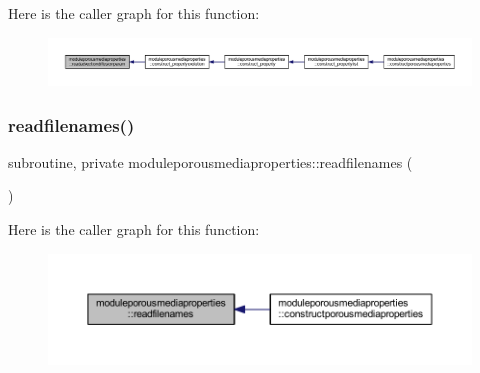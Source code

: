 Here is the caller graph for this function\+:\nopagebreak
\begin{figure}[H]
\begin{center}
\leavevmode
\includegraphics[width=350pt]{namespacemoduleporousmediaproperties_af16278987bb08e48f63b916cf573a68d_icgraph}
\end{center}
\end{figure}
\mbox{\label{namespacemoduleporousmediaproperties_a97ca52cdaf883bec238ac8f6844e5871}} 
\subsubsection{\texorpdfstring{readfilenames()}{readfilenames()}}
{\footnotesize\ttfamily subroutine, private moduleporousmediaproperties\+::readfilenames (\begin{DoxyParamCaption}{ }\end{DoxyParamCaption})\hspace{0.3cm}{\ttfamily [private]}}

Here is the caller graph for this function\+:\nopagebreak
\begin{figure}[H]
\begin{center}
\leavevmode
\includegraphics[width=350pt]{namespacemoduleporousmediaproperties_a97ca52cdaf883bec238ac8f6844e5871_icgraph}
\end{center}
\end{figure}
\mbox{\label{namespacemoduleporousmediaproperties_a9215099aea454d7ad22a07e69b0b6065}} 
